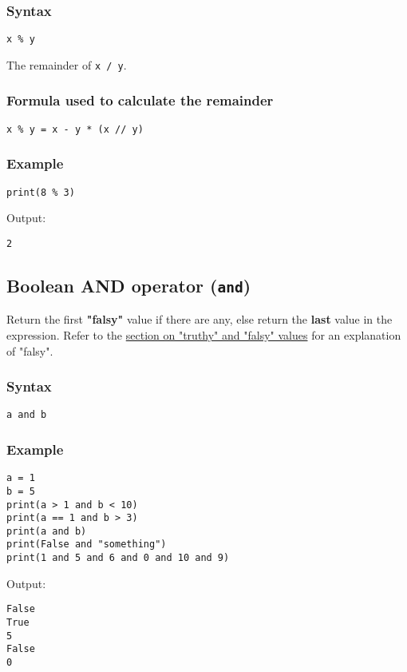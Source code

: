 \documentclass[11pt]{article}
\begin{document}
\subsubsection{Syntax}
\label{sec:org2d55c1e}
\texttt{x \% y}

 \noindent The remainder of \texttt{x / y}.
\subsubsection{Formula used to calculate the remainder}
\label{sec:orgffaf09f}
\texttt{x \% y = x - y * (x // y)}
\subsubsection{Example}
\label{sec:org73dee41}
\begin{verbatim}
print(8 % 3)
\end{verbatim}

 \noindent Output:

\label{orgd429800}
\begin{verbatim}
2
\end{verbatim}


 \newpage
\subsection{Boolean AND operator (\texttt{and})}
\label{sec:orgafb4524}
Return the first \textbf{"falsy"} value if there are any, else return the \textbf{last} value in the expression. Refer to the \hyperref[orgbe4ee6d]{section on "truthy" and "falsy" values} for an explanation of "falsy".
\subsubsection{Syntax}
\label{sec:orgc57cce6}
\begin{verbatim}
a and b
\end{verbatim}
\subsubsection{Example}
\label{sec:orgfdb29f6}
\begin{verbatim}
a = 1
b = 5
print(a > 1 and b < 10)
print(a == 1 and b > 3)
print(a and b)
print(False and "something")
print(1 and 5 and 6 and 0 and 10 and 9)
\end{verbatim}

 \noindent Output:

\label{org91bcb8f}
\begin{verbatim}
False
True
5
False
0
\end{verbatim}
\end{document}
